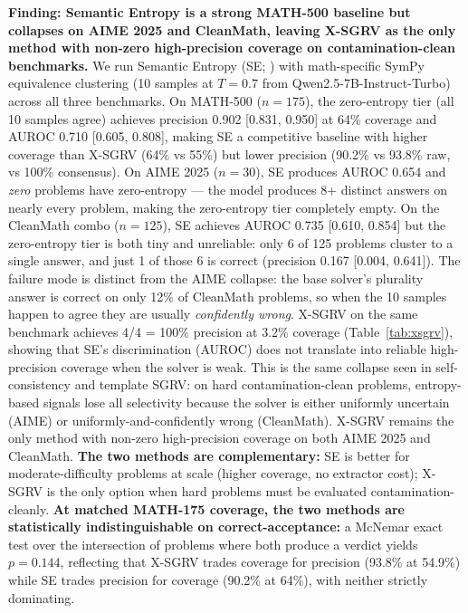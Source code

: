 \documentclass{article}
\begin{document}
\textbf{Finding: Semantic Entropy is a strong MATH-500 baseline but collapses on AIME 2025 and CleanMath, leaving X-SGRV as the only method with non-zero high-precision coverage on contamination-clean benchmarks.} We run Semantic Entropy (SE; \citealt{kuhn2023semantic}) with math-specific SymPy equivalence clustering (10 samples at $T{=}0.7$ from Qwen2.5-7B-Instruct-Turbo) across all three benchmarks. On MATH-500 ($n{=}175$), the zero-entropy tier (all 10 samples agree) achieves precision 0.902 [0.831, 0.950] at 64\% coverage and AUROC 0.710 [0.605, 0.808], making SE a competitive baseline with higher coverage than X-SGRV (64\% vs 55\%) but lower precision (90.2\% vs 93.8\% raw, vs 100\% consensus). On AIME 2025 ($n{=}30$), SE produces AUROC 0.654 and \emph{zero} problems have zero-entropy --- the model produces 8+ distinct answers on nearly every problem, making the zero-entropy tier completely empty. On the CleanMath combo ($n{=}125$), SE achieves AUROC 0.735 [0.610, 0.854] but the zero-entropy tier is both tiny and unreliable: only 6 of 125 problems cluster to a single answer, and just 1 of those 6 is correct (precision 0.167 [0.004, 0.641]). The failure mode is distinct from the AIME collapse: the base solver's plurality answer is correct on only 12\% of CleanMath problems, so when the 10 samples happen to agree they are usually \emph{confidently wrong}. X-SGRV on the same benchmark achieves 4/4 = 100\% precision at 3.2\% coverage (Table~\ref{tab:xsgrv}), showing that SE's discrimination (AUROC) does not translate into reliable high-precision coverage when the solver is weak. This is the same collapse seen in self-consistency and template SGRV: on hard contamination-clean problems, entropy-based signals lose all selectivity because the solver is either uniformly uncertain (AIME) or uniformly-and-confidently wrong (CleanMath). X-SGRV remains the only method with non-zero high-precision coverage on both AIME 2025 and CleanMath. \textbf{The two methods are complementary:} SE is better for moderate-difficulty problems at scale (higher coverage, no extractor cost); X-SGRV is the only option when hard problems must be evaluated contamination-cleanly. \textbf{At matched MATH-175 coverage, the two methods are statistically indistinguishable on correct-acceptance:} a McNemar exact test over the intersection of problems where both produce a verdict yields $p{=}0.144$, reflecting that X-SGRV trades coverage for precision (93.8\% at 54.9\%) while SE trades precision for coverage (90.2\% at 64\%), with neither strictly dominating.
\end{document}
